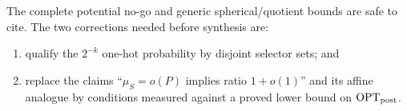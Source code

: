 \documentclass[11pt,a4paper]{article}
\begin{document}
The complete potential no-go and generic spherical/quotient bounds are safe to cite.  The two corrections needed before synthesis are:


\begin{enumerate}

\item qualify the \(2^{-k}\) one-hot probability by disjoint selector sets; and

\item replace the claims “\(\mu_S=o(P)\) implies ratio \(1+o(1)\)” and its affine analogue by conditions measured against a proved lower bound on \(\operatorname{OPT}_{\rm post}\).

\end{enumerate}
\end{document}
